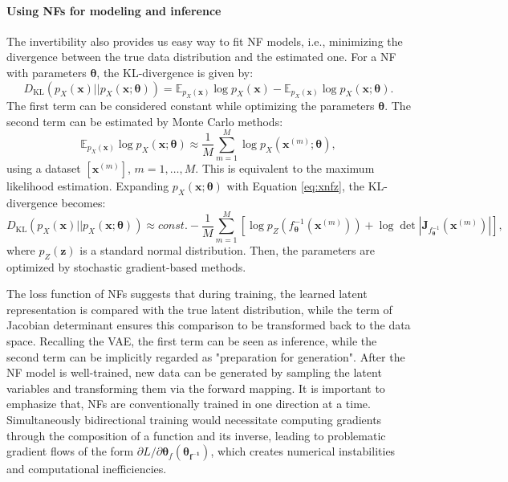 \paragraph{Using \acp{NF} for modeling and inference}
The invertibility also provides us easy way to fit \ac{NF} models, i.e., minimizing the divergence between the true data distribution and the estimated one. For a \ac{NF} with parameters $\boldsymbol{\theta}$, the KL-divergence is given by:
\begin{equation}
    D_{\text{KL}}(p_X(\boldsymbol{x})||p_{X}(\boldsymbol{x};\boldsymbol{\theta}))=\mathbb{E}_{p_X(\boldsymbol{x})}\log p_X(\boldsymbol{x}) - \mathbb{E}_{p_X(\boldsymbol{x})}\log p_{X}(\boldsymbol{x};\boldsymbol{\theta}).
\end{equation}
The first term can be considered constant while optimizing the parameters $\boldsymbol{\theta}$. The second term can be estimated by Monte Carlo methods:
\begin{equation}
    \mathbb{E}_{p_X(\boldsymbol{x})}\log p_{X}(\boldsymbol{x};\boldsymbol{\theta})\approx \frac{1}{M}\sum_{m=1}^{M}\log p_{X}(\boldsymbol{x}^{(m)};\boldsymbol{\theta}),
\end{equation}
using a dataset $[\boldsymbol{x}^{(m)}]$, $m=1,\dots,M$.
This is equivalent to the maximum likelihood estimation.
Expanding $p_{X}(\boldsymbol{x};\boldsymbol{\theta})$ with Equation \ref{eq:xnfz}, the KL-divergence becomes:
\begin{equation}
\label{eq:kl_nf}
D_{\text{KL}}(p_X(\boldsymbol{x})||p_{X}(\boldsymbol{x};\boldsymbol{\theta}))\approx const. - 
\frac{1}{M}\sum_{m=1}^{M}[\log p_{Z}(f_{\boldsymbol{\theta}}^{-1}(\boldsymbol{x}^{(m)}))+\log\det\left|\boldsymbol{J}_{f_{\boldsymbol{\theta}}^{-1}}(\boldsymbol{x}^{(m)})\right|],
\end{equation}
where $p_Z(\boldsymbol{z})$ is a standard normal distribution. Then, the parameters are optimized by stochastic gradient-based methods.

The loss function of \acp{NF} suggests that during training, the learned latent representation is compared with the true latent distribution, while the term of Jacobian determinant ensures this comparison to be transformed back to the data space. Recalling the \ac{VAE}, the first term can be seen as inference, while the second term can be implicitly regarded as "preparation for generation". After the \ac{NF} model is well-trained, new data can be generated by sampling the latent variables and transforming them via the forward mapping. It is important to emphasize that, \acp{NF} are conventionally trained in one direction at a time. Simultaneously bidirectional training would necessitate computing gradients through the composition of a function and its inverse, leading to problematic gradient flows of the form $\partial L/\partial \boldsymbol{\theta}_f(\boldsymbol{\theta_{f^{-1}}})$, which creates numerical instabilities and computational inefficiencies.

